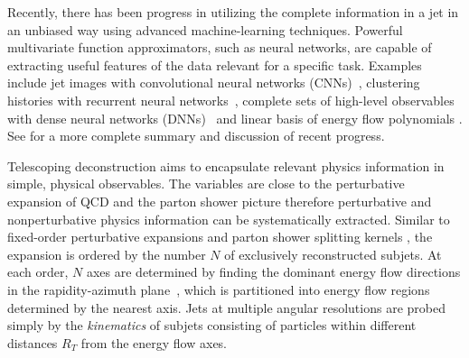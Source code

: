 \documentclass[notoc]{JHEP3}
\begin{document}
Recently, there has been progress in utilizing the complete information in a jet in an unbiased way using advanced machine-learning techniques. Powerful multivariate function approximators, such as neural networks, are capable of extracting useful features of the data relevant for a specific task. Examples include jet images with convolutional neural networks (CNNs)~\cite{Cogan:2014oua,deOliveira:2015xxd,Komiske:2016rsd,Kasieczka:2017nvn}, clustering histories with recurrent neural networks~\cite{Louppe:2017ipp}, complete sets of high-level observables with dense neural networks (DNNs)~\cite{Datta:2017rhs,Datta:2017lxt,Aguilar-Saavedra:2017rzt} and linear basis of energy flow polynomials \cite{Komiske:2017aww}. See \cite{Larkoski:2017jix} for a more complete summary and discussion of recent progress. %

Telescoping deconstruction aims to encapsulate relevant physics information in simple, physical observables. The variables are close to the perturbative expansion of QCD and the parton shower picture therefore perturbative and nonperturbative physics information can be systematically extracted. Similar to fixed-order perturbative expansions and parton shower splitting kernels \cite{Nagy:2017ggp}, the expansion is ordered by the number $N$ of exclusively reconstructed subjets. At each order, $N$ axes are determined by finding the dominant energy flow directions in the rapidity-azimuth plane~\cite{Stewart:2010tn,Chien:2013kca,Stewart:2015waa,Thaler:2015xaa}, which is partitioned into energy flow regions determined by the nearest axis. Jets at multiple angular resolutions are probed simply by the {\sl kinematics} of subjets consisting of particles within different distances $R_T$ from the energy flow axes.
\end{document}
